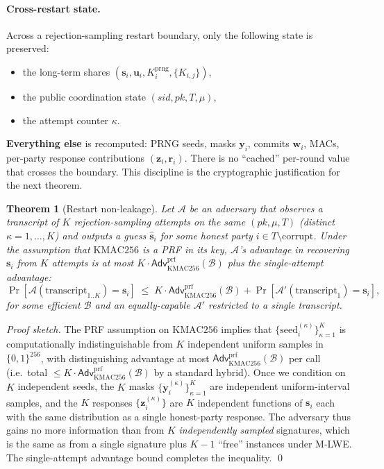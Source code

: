 \documentclass[11pt,a4paper]{article}
\newtheorem{theorem}{Theorem}
\theoremstyle{definition}
\theoremstyle{remark}
\newcommand{\Adv}{\mathsf{Adv}}
\newcommand{\KMAC}{\mathrm{KMAC256}}
\begin{document}
\paragraph{Cross-restart state.}
Across a rejection-sampling restart boundary, only the following
state is preserved:
\begin{itemize}[leftmargin=*, itemsep=0pt]
\item the long-term shares $(\mathbf{s}_i, \mathbf{u}_i, K_i^{\mathrm{prng}}, \{K_{i,j}\})$,
\item the public coordination state $(\mathit{sid}, \mathit{pk}, T, \mu)$,
\item the attempt counter $\kappa$.
\end{itemize}
\textbf{Everything else} is recomputed: PRNG seeds, masks
$\mathbf{y}_i$, commits $\mathbf{w}_i$, MACs, per-party response
contributions $(\mathbf{z}_i, \mathbf{r}_i)$. There is no
``cached'' per-round value that crosses the boundary. This
discipline is the cryptographic justification for the next theorem.

\begin{theorem}[Restart non-leakage]
\label{thm:restart-non-leak}
Let $\mathcal{A}$ be an adversary that observes a transcript of $K$
rejection-sampling attempts on the same $(\mathit{pk}, \mu, T)$
(distinct $\kappa = 1, \dots, K$) and outputs a guess
$\hat{\mathbf{s}}_i$ for some honest party $i \in T \setminus
\mathrm{corrupt}$. Under the assumption that $\KMAC$ is a PRF in its
key, $\mathcal{A}$'s advantage in recovering $\mathbf{s}_i$ from $K$
attempts is at most $K \cdot \Adv^{\mathrm{prf}}_{\KMAC}(\mathcal{B})$
plus the single-attempt advantage:
\[
\Pr[\mathcal{A}(\mathrm{transcript}_{1..K}) = \mathbf{s}_i]
\;\le\;
K \cdot \Adv^{\mathrm{prf}}_{\KMAC}(\mathcal{B})
+ \Pr[\mathcal{A}'(\mathrm{transcript}_{1}) = \mathbf{s}_i],
\]
for some efficient $\mathcal{B}$ and an equally-capable
$\mathcal{A}'$ restricted to a single transcript.
\end{theorem}

\begin{proof}[Proof sketch]
The PRF assumption on $\KMAC$ implies that
$\{\text{seed}_i^{(\kappa)}\}_{\kappa=1}^K$ is computationally
indistinguishable from $K$ independent uniform samples in
$\{0,1\}^{256}$, with distinguishing advantage at most
$\Adv^{\mathrm{prf}}_{\KMAC}(\mathcal{B})$ per call (i.e.\
total $\le K \cdot \Adv^{\mathrm{prf}}_{\KMAC}(\mathcal{B})$ by a
standard hybrid). Once we condition on $K$ independent seeds, the
$K$ masks $\{\mathbf{y}_i^{(\kappa)}\}_{\kappa=1}^K$ are independent
uniform-interval samples, and the $K$ responses
$\{\mathbf{z}_i^{(\kappa)}\}$ are $K$ independent functions of
$\mathbf{s}_i$ each with the same distribution as a single
honest-party response. The adversary thus gains no more information
than from $K$ \emph{independently sampled} signatures, which is the
same as from a single signature plus $K-1$ ``free'' instances under
M-LWE. The single-attempt advantage bound completes the
inequality. \qed
\end{proof}
\end{document}
